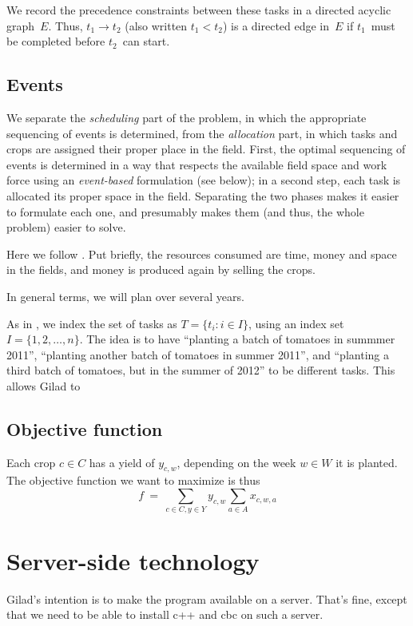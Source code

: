\documentclass[11pt]{amsart}
\numberwithin{equation}{section}
\begin{document}
We record the precedence constraints between these tasks in a directed
acyclic graph~$E$. Thus, $t_1\longrightarrow t_2$ (also written
$t_1<t_2$) is a directed edge in~$E$ if $t_1$~must be completed
before $t_2$~can start.

\subsection{Events}


We separate the \emph{scheduling} part of the problem, in which the
appropriate sequencing of events is determined, from the
\emph{allocation} part, in which tasks and crops are assigned their
proper place in the field. First, the optimal sequencing of events is
determined in a way that respects the available field space and work
force using an \emph{event-based} formulation (see below); in a second
step, each task is allocated its proper space in the field. Separating
the two phases makes it easier to formulate each one, and presumably
makes them (and thus, the whole problem) easier to solve.


Here we follow \cite{artigues-etal11}. Put briefly, the resources
consumed are time, money and space in the fields, and money is
produced again by selling the crops.

In general terms, we will plan over several years.

As in \cite{artigues-etal11}, we index the set of tasks as
$T=\{t_i:i\in I\}$, using an index set $I=\{1,2,\dots,n\}$. The idea
is to have ``planting a batch of tomatoes in summmer 2011'',
``planting another batch of tomatoes in summer 2011'', and ``planting
a third batch of tomatoes, but in the summer of 2012'' to be different
tasks. This allows Gilad to 



\subsection{Objective function}

Each crop $c\in C$ has a yield of  $y_{c,w}$, depending on the week
$w\in W$ it is planted. 
The objective function we want to  maximize is thus
\[
   f 
   \ = \
   \sum_{c\in C, y\in Y} y_{c,w} \sum_{a\in A} x_{c,w,a}
\]

\section{Server-side technology}

Gilad's intention is to make the program available on a server. That's
fine, except that we need to be able to install c++ and cbc on such a server.



\end{document}
